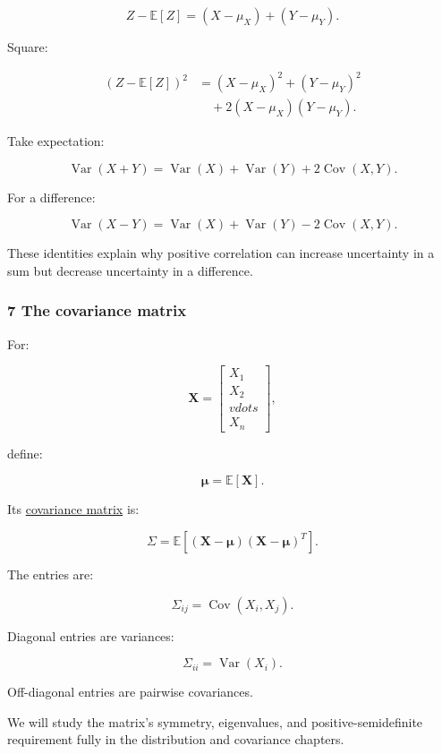 \[
 Z-\mathbb E[Z] = (X-\mu_X)+(Y-\mu_Y).
\]

Square:

\[
 \begin{aligned} (Z-\mathbb E[Z])^2 &=(X-\mu_X)^2+(Y-\mu_Y)^2\\ &\quad+2(X-\mu_X)(Y-\mu_Y). \end{aligned}
\]

Take expectation:

\[
 \boxed{ \operatorname{Var}(X+Y) = \operatorname{Var}(X)+ \operatorname{Var}(Y)+ 2\operatorname{Cov}(X,Y) }.
\]

For a difference:

\[
 \boxed{ \operatorname{Var}(X-Y) = \operatorname{Var}(X)+ \operatorname{Var}(Y)- 2\operatorname{Cov}(X,Y) }.
\]

These identities explain why positive correlation can increase uncertainty in a sum but decrease uncertainty in a difference.

\subsubsection{7 The covariance matrix}\label{02-foundations-ii-ch023-the-covariance-matrix}

For:

\[
 \mathbf X= \begin{bmatrix}X_1\\X_2\\vdots\\X_n\end{bmatrix},
\]

define:

\[
 \boldsymbol\mu=\mathbb E[\mathbf X].
\]

Its \hyperref[02-foundations-ii-ch023-expected-values-describe-centers-covariance-describes-dependence]{covariance matrix} is:

\[
 \boxed{ \Sigma= \mathbb E[ (\mathbf X-\boldsymbol\mu) (\mathbf X-\boldsymbol\mu)^T ] }.
\]

The entries are:

\[
 \Sigma_{ij}=\operatorname{Cov}(X_i,X_j).
\]

Diagonal entries are variances:

\[
 \Sigma_{ii}=\operatorname{Var}(X_i).
\]

Off-diagonal entries are pairwise covariances.

We will study the matrix's symmetry, eigenvalues, and positive-semidefinite requirement fully in the distribution and covariance chapters.

